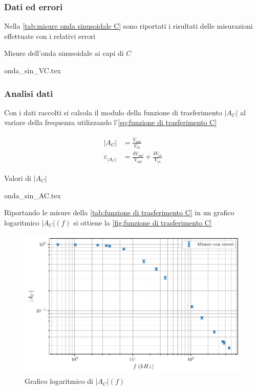 \documentclass[11pt, a4paper]{article}
\numberwithin{equation}{section} %
\begin{document}
\subsubsection{Dati ed errori}

Nella \autoref{tab:misure onda sinusoidale C} sono riportati i risultati delle misurazioni effettuate con i relativi errori

\begin{table}[ht!]
    \centering
    \caption{Misure dell'onda sinusoidale ai capi di $C$}
    {onda_sin_VC.tex}
    \label{tab:misure onda sinusoidale C}
\end{table}

\newpage

\subsubsection{Analisi dati}

Con i dati raccolti si calcola il modulo della funzione di trasferimento $|A_{C}|$ al variare della frequenza utilizzando l'\autoref{eq:funzione di trasferimento C}

\begin{align} \label{eq:funzione di trasferimento C}
    \begin{split}
        |A_{C}| &= \frac{V_{out}}{V_{in}} \\
        \varepsilon_{|A_{C}|} &= \frac{\delta V_{out}}{V_{out}} + \frac{\delta V_{in}}{V_{in}}
    \end{split}
\end{align}

\begin{table}[ht!]
    \centering
    \caption{Valori di $|A_{C}|$}
    {onda_sin_AC.tex}
    \label{tab:funzione di trasferimento C}
\end{table}

Riportando le misure della \autoref{tab:funzione di trasferimento C} in un grafico logaritmico $|A_{C}|(f)$ si ottiene la \autoref{fig:funzione di trasferimento C}

\begin{figure}[ht!]
    \includegraphics{onda_sin_AC(f).pdf}
    \caption{Grafico logaritmico di $|A_{C}|(f)$}
    \label{fig:funzione di trasferimento C}
\end{figure}
\end{document}

